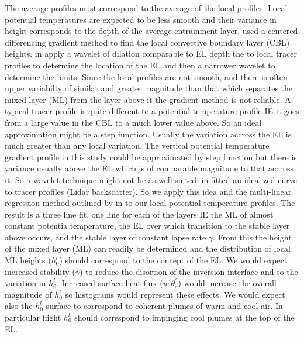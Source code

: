 The average profiles must correspond to the average of the local profiles.  Local potential temperatures are expected to be less smooth and their variance in height corresponds to the depth of the average entrainment layer.  \citeauthor{SullMoengStev} \cite{SullMoengStev} used a centered differencing gradient method to find the local convective boundary layer (\acs{CBL}) heights. \citeauthor{BrooksFowler2} in \cite{BrooksFowler2} apply a wavelet of dilation comparable to \acs{EL} depth the to local tracer profiles to determine the location of the \acs{EL} and then a narrower wavelet to determine the limits.  Since the local profiles are not smooth, and there is often upper variabilty of similar and greater magnitude than that which separates the mixed layer (\acs{ML}) from the layer above it the gradient method is not reliable.  A typical tracer profile is quite different to a potential temperature profile IE it goes from a large value in the \acs{CBL} to a much lower value above.  So an ideal approximation might be a step function.  Usually the variation accross the \acs{EL} is much greater than any local variation.  The vertical potential temperature gradient profile in this study could be approximated by step function but there is variance usually above the \acs{EL} which is of comparable magnitude to that accross it.  So a wavelet technique might not be as well suited. \citeauthor{SteynBaldHoff} in \cite{SteynBaldHoff} fitted an idealized curve to tracer profiles (Lidar backscatter).  So we apply this idea and the multi-linear regression method outlined by \citeauthor{Vieth} in \cite{Vieth} to our local potential temperature profiles.  The result is a three line fit, one line for each of the layers IE the \acs{ML} of almost constant potentia temperature, the \acs{EL} over which transition to the stable layer above occurs, and the stable layer of constant lapse rate $\gamma$.  From
this the height of the mixed layer (\acs{ML}) can readily be determined and the distribution of local \acs{ML} heights ($h^{l}_{0}$) should correspond to the concept of the \acs{EL}.  We would expect increased stability ($\gamma$) to reduce the disortion of the inversion interface and so the variation in $h^{l}_{0}$. Increased surface heat flux ($w^{'}\theta^{'}_{s}$) would increase the overall magnitude of $h^{l}_{0}$ so histograms would represent these effects.  We would expect also the $h^{l}_{0}$ surface to correspond to coherent plumes of warm and cool air.  In particular hight $h^{l}_{0}$ should correspond to impinging cool plumes at the top of the \acs{EL}.

